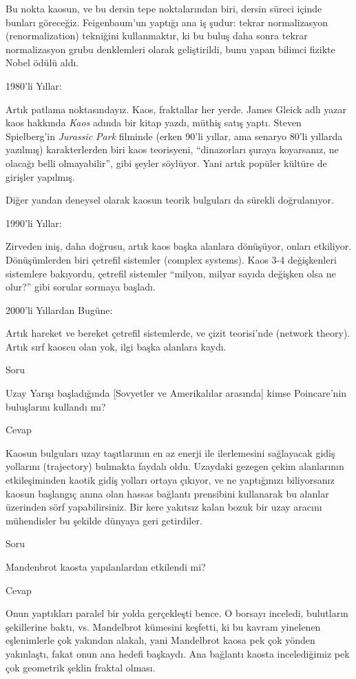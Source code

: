 \documentclass[12pt,fleqn]{article}\usepackage{../../common}
\begin{document}
Bu nokta kaosun, ve bu dersin tepe noktalarından biri, dersin süreci içinde
bunları göreceğiz. Feigenbaum'un yaptığı ana iş şudur: tekrar normalizasyon
(renormalization) tekniğini kullanmaktır, ki bu buluş daha sonra tekrar
normalizasyon grubu denklemleri olarak geliştirildi, bunu yapan bilimci
fizikte Nobel ödülü aldı.

1980'li Yıllar:

Artık patlama noktasındayız. Kaos, fraktallar her yerde. James Gleick adlı
yazar kaos hakkında {\em Kaos} adında bir kitap yazdı, müthiş satış
yaptı. Steven Spielberg'in {\em Jurassic Park} filminde (erken 90'li
yıllar, ama senaryo 80'li yıllarda yazılmış) karakterlerden biri kaos
teorisyeni, ``dinazorları şuraya koyarsanız, ne olacağı belli
olmayabilir'', gibi şeyler söylüyor. Yani artık popüler kültüre de girişler
yapılmış.

Diğer yandan deneysel olarak kaosun teorik bulguları da sürekli doğrulanıyor. 

1990'li Yıllar: 

Zirveden iniş, daha doğrusu, artık kaos başka alanlara dönüşüyor, onları
etkiliyor. Dönüşümlerden biri çetrefil sistemler (complex systems). Kaos
3-4 değişkenleri sistemlere bakıyordu, çetrefil sistemler ``milyon, milyar
sayıda değişken olsa ne olur?'' gibi sorular sormaya başladı. 

2000'li Yıllardan Bugüne: 

Artık hareket ve bereket çetrefil sistemlerde, ve çizit teorisi'nde
(network theory). Artık sırf kaoscu olan yok, ilgi başka alanlara kaydı.

Soru

Uzay Yarışı başladığında [Sovyetler ve Amerikalılar arasında] kimse
Poincare'nin buluşlarını kullandı mı? 

Cevap

Kaosun bulguları uzay taşıtlarının en az enerji ile ilerlemesini sağlayacak
gidiş yollarını (trajectory) bulmakta faydalı oldu. Uzaydaki gezegen çekim
alanlarının etkileşiminden kaotik gidiş yolları ortaya çıkıyor, ve ne
yaptığınızı biliyorsanız kaosun başlangıç anına olan hassas bağlantı
prensibini kullanarak bu alanlar üzerinden sörf yapabilirsiniz. Bir kere
yakıtsız kalan bozuk bir uzay aracını mühendisler bu şekilde dünyaya geri
getirdiler.

Soru

Mandenbrot kaosta yapılanlardan etkilendi mi? 

Cevap

Onun yaptıkları paralel bir yolda gerçekleşti bence. O borsayı inceledi,
bulutların şekillerine baktı, vs. Mandelbrot kümesini keşfetti, ki bu kavram
yinelenen eşlenimlerle çok yakından alakalı, yani Mandelbrot kaosa pek çok
yönden yakınlaştı, fakat onun ana hedefi başkaydı. Ana bağlantı kaosta
incelediğimiz pek çok geometrik şeklin fraktal olması.
\end{document}
